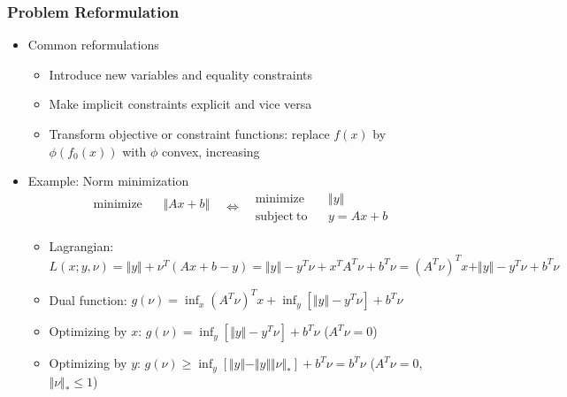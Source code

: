 \subsubsection*{Problem Reformulation}
\begin{itemize}
    \item Common reformulations
    \begin{itemize}
        \item Introduce new variables and equality constraints
        \item Make implicit constraints explicit and vice versa
        \item Transform objective or constraint functions: replace $f(x)$ by $\phi(f_0(x))$ with $\phi$ convex, increasing
    \end{itemize}
    \item Example: Norm minimization
        $$ \begin{aligned}
            \mathrm{minimize}~~&~~\Vert Ax+b \Vert \\ {}
        \end{aligned}~~~\Leftrightarrow~~~\begin{aligned}
            \mathrm{minimize}~~&~~\Vert y\Vert \\
            \mathrm{subject~to}~~&~~y = Ax + b
        \end{aligned} $$
    \begin{itemize}
        \item Lagrangian: $L(x;y,\nu) = \Vert y\Vert+\nu^T(Ax+b-y) = \Vert y\Vert-y^T\nu+x^TA^T\nu+b^T\nu = (A^T\nu)^Tx + \Vert y\Vert - y^T\nu + b^T\nu$
        \item Dual function: $g(\nu) = \inf_{x}(A^T\nu)^Tx + \inf_{y}\left[\Vert y\Vert - y^T\nu\right] + b^T\nu$
        \item Optimizing by $x$: $g(\nu) = \inf_{y}\left[\Vert y\Vert - y^T\nu\right] + b^T\nu$ ($A^T\nu = 0$)
        \item Optimizing by $y$: $g(\nu)\geq\inf_{y}\left[\Vert y\Vert - \Vert y\Vert\Vert\nu\Vert_\ast\right]+b^T\nu = b^T\nu$ ($A^T\nu = 0$, $\Vert\nu\Vert_\ast\leq 1$)
    \end{itemize}
\end{itemize}
